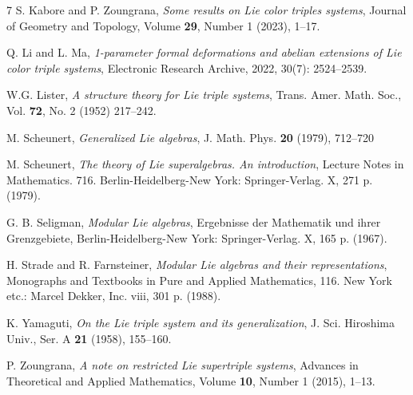 \documentclass[11pt, twoside]{article}
\begin{document}
\begin{thebibliography}{7}
        S. Kabore and P. Zoungrana,
        \emph{Some results on Lie color triples systems}, Journal of Geometry and Topology, Volume {\bf 29}, Number 1 (2023), 1--17.

        Q. Li and L. Ma,
        \emph{1-parameter formal deformations and abelian extensions of Lie color triple systems}, 
        Electronic Research Archive, 2022, 30(7): 2524--2539. 

        W.G. Lister,
        \emph{A structure theory for Lie triple systems}, Trans. Amer. Math. Soc., Vol. {\bf 72}, No. 2 (1952) 217--242.

        M. Scheunert, 
        \emph{Generalized Lie algebras},  J. Math. Phys. {\bf 20} (1979), 712--720

        M. Scheunert, 
        \emph{The theory of Lie superalgebras. An introduction}, Lecture Notes in Mathematics. 716. Berlin-Heidelberg-New York: Springer-Verlag. X,  271 p. (1979).

        G. B. Seligman,
        \emph{Modular Lie algebras}, Ergebnisse der Mathematik und ihrer Grenzgebiete, Berlin-Heidelberg-New York: Springer-Verlag. X, 165 p. (1967). 

        H. Strade and R. Farnsteiner,
        \emph{Modular Lie algebras and their representations},
        Monographs and Textbooks in Pure and Applied Mathematics, 116. New York etc.: Marcel Dekker, Inc. viii, 301 p. (1988).

K. Yamaguti,
 \emph{On the Lie triple system and its generalization},
J. Sci. Hiroshima Univ., Ser. A {\bf 21} (1958), 155--160.
       
        P. Zoungrana,
        \emph{A note on restricted Lie supertriple systems}, Advances in Theoretical and Applied Mathematics, Volume {\bf 10}, Number 1 (2015), 1--13.

        
	\end{thebibliography}
\end{document}
